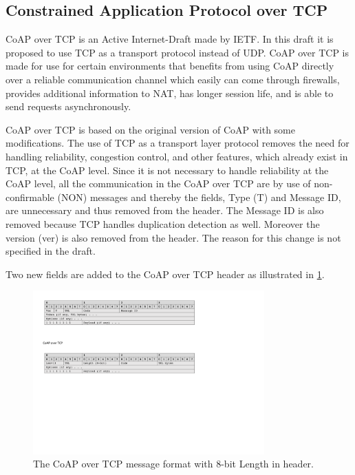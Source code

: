 


\subsection{Constrained Application Protocol over TCP}
CoAP over TCP is an Active Internet-Draft made by IETF. 
In this draft it is proposed to use TCP as a transport protocol instead of UDP.
CoAP over TCP is made for use for certain environments that benefits from using CoAP directly over a reliable communication channel which easily can come through firewalls, provides additional information to NAT, has longer session life, and is able to send requests asynchronously. 

CoAP over TCP is based on the original version of CoAP with some modifications. 
The use of TCP as a transport layer protocol removes the need for handling reliability, congestion control, and other features, which already exist in TCP, at the CoAP level.
Since it is not necessary to handle reliability at the CoAP level, all the communication in the CoAP over TCP are by use of non-confirmable (NON) messages and thereby the fields, Type (T) and Message ID, are unnecessary and thus removed from the header. 
The Message ID is also removed because TCP handles duplication detection as well.
Moreover the version (ver) is also removed from the header. The reason for this change is not specified in the draft.

Two new fields are added to the CoAP over TCP header as illustrated in \figurename{\ref{fig:msgformatcoapovertcp}}.
\begin{figure}[bht]
	\centering
	\includegraphics[width=3.5in]{gfx/msgformat-coapovertcp}
	\caption{The CoAP over TCP message format with 8-bit Length in header.}
	\label{fig:msgformatcoapovertcp}
\end{figure}

